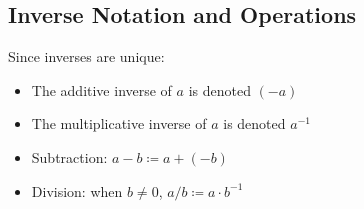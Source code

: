 \subsection{Inverse Notation and Operations}

Since inverses are unique:
\begin{itemize}
    \item The additive inverse of $a$ is denoted $(-a)$
    \item The multiplicative inverse of $a$ is denoted $a^{-1}$
    \item Subtraction: $a - b \coloneqq a + (-b)$
    \item Division: when $b \neq 0$, $a/b \coloneqq a \cdot b^{-1}$
\end{itemize}
